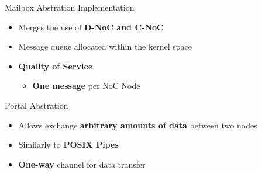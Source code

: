 		\begin{frame}[fragile]{Mailbox Abstration Implementation}
			\begin{itemize}
				\item Merges the use of \textbf{D-NoC and C-NoC}
				\item Message queue allocated within the kernel space
				\item \textbf{Quality of Service}
				\begin{itemize}
					\item \textbf{One message} per NoC Node
				\end{itemize}
			\end{itemize}


			
		\end{frame}

		\begin{frame}[fragile]{Portal Abstration}
			\begin{itemize}
				\item Allows exchange \textbf{arbitrary amounts of data} between two nodes
				\item Similarly to \textbf{POSIX Pipes}
				\item \textbf{One-way} channel for data transfer
			\end{itemize}


		\end{frame}

